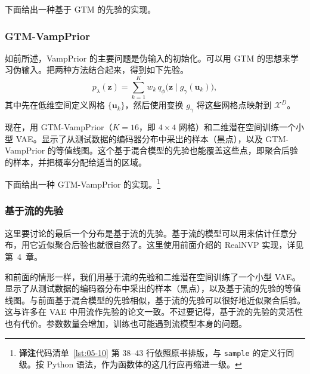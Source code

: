 
下面给出一种基于 GTM 的先验的实现。

\subsubsection{GTM-VampPrior}
如前所述，VampPrior 的主要问题是伪输入的初始化。可以用 GTM 的思想来学习伪输入。把两种方法结合起来，得到如下先验。
\begin{equation}
p_\lambda(\mathbf{z})=\sum_{k=1}^K w_k\,q_\phi\bigl(\mathbf{z}\mid g_\gamma(\mathbf{u}_k)\bigr),
\tag{5.53}\label{eq:05-53}
\end{equation}
其中先在低维空间定义网格 $\{\mathbf{u}_k\}$，然后使用变换 $g_\gamma$ 将这些网格点映射到 $\mathcal{X}^D$。

现在，用 GTM-VampPrior（$K=16$，即 $4\times4$ 网格）和二维潜在空间训练一个小型 VAE。显示了从测试数据的编码器分布中采出的样本（黑点），以及 GTM-VampPrior 的等值线图。这个基于混合模型的先验也能覆盖这些点，即聚合后验的样本，并把概率分配给适当的区域。

下面给出一种 GTM-VampPrior 的实现。\footnote{\textbf{译注}\quad 代码清单~\ref{lst:05-10} 第 38--43 行依照原书排版，与 \texttt{sample} 的定义行同级。按 Python 语法，作为函数体的这几行应再缩进一级。}


\subsubsection{基于流的先验}
这里要讨论的最后一个分布是基于流的先验。基于流的模型可以用来估计任意分布，用它近似聚合后验也就很自然了。这里使用前面介绍的 RealNVP 实现，详见第~4~章。


和前面的情形一样，我们用基于流的先验和二维潜在空间训练了一个小型 VAE。显示了从测试数据的编码器分布中采出的样本（黑点），以及基于流的先验的等值线图。与前面基于混合模型的先验相似，基于流的先验可以很好地近似聚合后验。这与许多在 VAE 中用流作先验的论文一致。不过要记得，基于流的先验的灵活性也有代价。参数数量会增加，训练也可能遇到流模型本身的问题。

